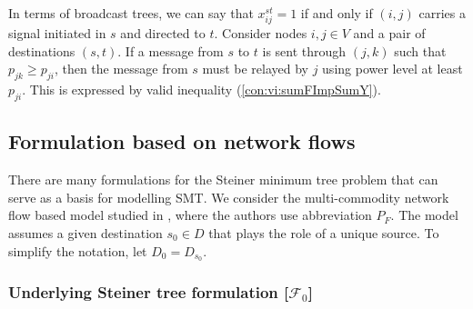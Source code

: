 In terms of broadcast trees, we can say that $x_{ij}^{st}=1$ if and only if $(i,j)$ carries a signal initiated in $s$ and directed to $t$.
Consider nodes $i,j\in V$ and a pair of destinations $(s,t)$.
If a message from $s$ to $t$ is sent through $(j,k)$ such that $p_{jk}\geq p_{ji}$, then the message from $s$ must be relayed by $j$ using power level at least $p_{ji}$.
This is expressed by valid inequality (\ref{con:vi:sumFImpSumY}).

\subsection{Formulation based on network flows}

There are many formulations for the Steiner minimum tree problem that can serve as a basis for modelling SMT.
We consider the multi-commodity network flow based model studied in \cite{Polzin}, where the authors use abbreviation $P_{F}$.
The model assumes a given destination $s_0\in D$ that plays the role of a unique source.
To simplify the notation, let $D_0= D_{s_0}$.

\subsubsection{Underlying Steiner tree formulation [$\mathcal{F}_0$]}

